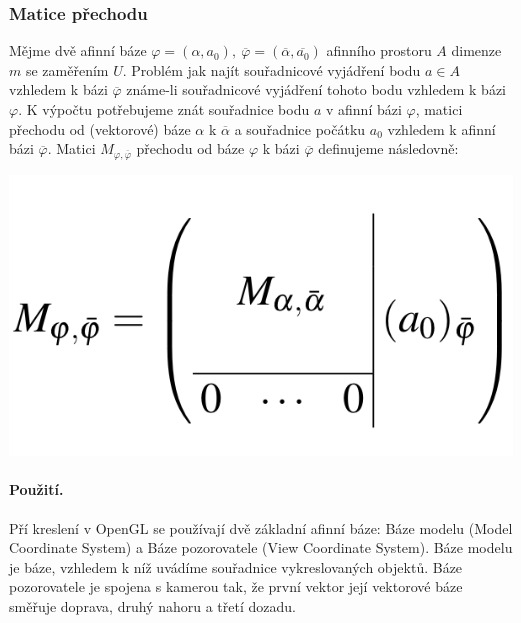 \documentclass[12pt,a4paper]{article}
\begin{document}
\subsubsection{Matice přechodu}
Mějme dvě afinní báze $\varphi = (\alpha, a_0), \ \overline{\varphi} = (\overline{\alpha}, \overline{a_0})$ afinního prostoru $A$ dimenze $m$ se zaměřením $U$.  Problém jak najít souřadnicové vyjádření bodu $a \in A$ vzhledem k bázi $\overline{\varphi}$ známe-li souřadnicové vyjádření tohoto bodu vzhledem k bázi $\varphi$. K výpočtu potřebujeme znát souřadnice bodu $a$ v afinní bázi $\varphi$, matici přechodu od (vektorové) báze $\alpha$ k $\overline{\alpha}$ a souřadnice počátku $a_0$ vzhledem k afinní bázi $\overline{\varphi}$. Matici $M_{\varphi,\overline{\varphi}}$ přechodu od báze $\varphi$ k bázi $\overline{\varphi}$ definujeme následovně:
\begin{center}
	\includegraphics[scale=0.4]{img/MaticePrechodu}
\end{center}

\paragraph{Použití.} Pří kreslení v OpenGL se používají dvě základní afinní báze: Báze modelu (Model Coordinate System) a Báze pozorovatele (View Coordinate System). Báze modelu je báze, vzhledem k níž uvádíme souřadnice vykreslovaných objektů. Báze pozorovatele je spojena s kamerou tak, že první vektor její vektorové báze směřuje doprava, druhý nahoru a třetí dozadu.
\end{document}
